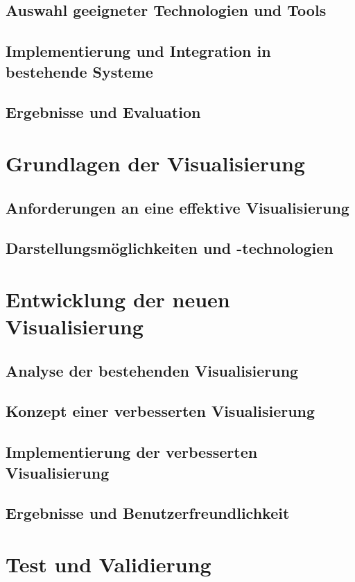 \documentclass[a4paper, 12pt]{article} %
\begin{document}
\subsection{Auswahl geeigneter Technologien und Tools}
\subsection{Implementierung und Integration in bestehende Systeme}
\subsection{Ergebnisse und Evaluation}

\section{Grundlagen der Visualisierung}
\subsection{Anforderungen an eine effektive Visualisierung}
\subsection{Darstellungsmöglichkeiten und -technologien}

\section{Entwicklung der neuen Visualisierung}
\subsection{Analyse der bestehenden Visualisierung}
\subsection{Konzept einer verbesserten Visualisierung}
\subsection{Implementierung der verbesserten Visualisierung}
\subsection{Ergebnisse und Benutzerfreundlichkeit}

\section{Test und Validierung}
\end{document}
